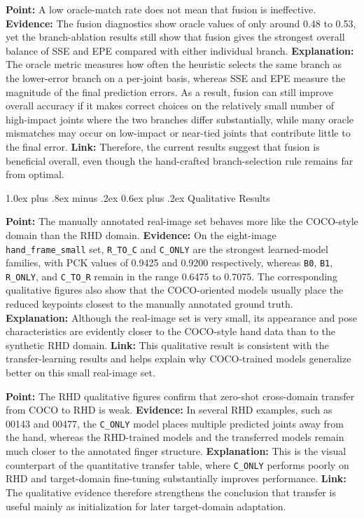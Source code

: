 \documentclass[10pt,letterpaper]{article}
\makeatletter
\renewcommand\subsection{\@startsection{subsection}{2}{\z@}%
  {1.0ex plus .8ex minus .2ex}%
  {0.6ex plus .2ex}%
  {\normalfont\itshape}}
\makeatother
\begin{document}
\noindent\textbf{Point:} A low oracle-match rate does not mean that fusion is ineffective.
\textbf{Evidence:} The fusion diagnostics show oracle values of only around 0.48 to 0.53, yet the branch-ablation results still show that fusion gives the strongest overall balance of SSE and EPE compared with either individual branch.
\textbf{Explanation:} The oracle metric measures how often the heuristic selects the same branch as the lower-error branch on a per-joint basis, whereas SSE and EPE measure the magnitude of the final prediction errors. As a result, fusion can still improve overall accuracy if it makes correct choices on the relatively small number of high-impact joints where the two branches differ substantially, while many oracle mismatches may occur on low-impact or near-tied joints that contribute little to the final error.
\textbf{Link:} Therefore, the current results suggest that fusion is beneficial overall, even though the hand-crafted branch-selection rule remains far from optimal.



\subsection{Qualitative Results}

\noindent\textbf{Point:} The manually annotated real-image set behaves more like the COCO-style domain than the RHD domain.
\textbf{Evidence:} On the eight-image \texttt{hand\_frame\_small} set, \texttt{R\_TO\_C} and \texttt{C\_ONLY} are the strongest learned-model families, with PCK values of 0.9425 and 0.9200 respectively, whereas \texttt{B0}, \texttt{B1}, \texttt{R\_ONLY}, and \texttt{C\_TO\_R} remain in the range 0.6475 to 0.7075. The corresponding qualitative figures also show that the COCO-oriented models usually place the reduced keypoints closest to the manually annotated ground truth.
\textbf{Explanation:} Although the real-image set is very small, its appearance and pose characteristics are evidently closer to the COCO-style hand data than to the synthetic RHD domain.
\textbf{Link:} This qualitative result is consistent with the transfer-learning results and helps explain why COCO-trained models generalize better on this small real-image set.

\medskip
\noindent\textbf{Point:} The RHD qualitative figures confirm that zero-shot cross-domain transfer from COCO to RHD is weak.
\textbf{Evidence:} In several RHD examples, such as 00143 and 00477, the \texttt{C\_ONLY} model places multiple predicted joints away from the hand, whereas the RHD-trained models and the transferred models remain much closer to the annotated finger structure.
\textbf{Explanation:} This is the visual counterpart of the quantitative transfer table, where \texttt{C\_ONLY} performs poorly on RHD and target-domain fine-tuning substantially improves performance.
\textbf{Link:} The qualitative evidence therefore strengthens the conclusion that transfer is useful mainly as initialization for later target-domain adaptation.
\end{document}
